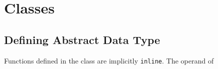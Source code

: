 \documentclass[11pt]{ctexart}
\begin{document}
\section{Classes}
\subsection{Defining Abstract Data Type}
\par Functions defined in the class are implicitly \verb|inline|. The operand of 
\end{document}
